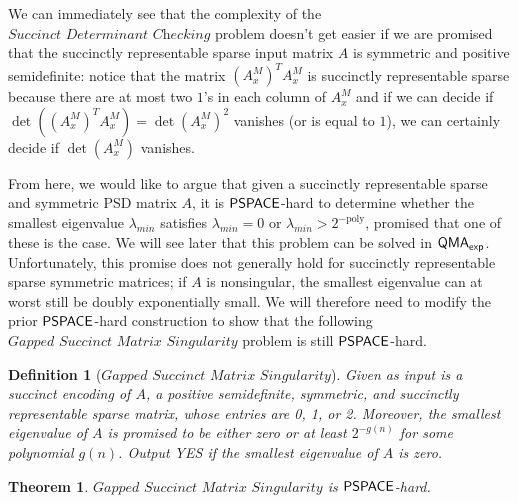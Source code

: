 \documentclass[11pt]{article}
\newtheorem{theorem}{Theorem}
\newtheorem{definition}{Definition}
\theoremstyle{definition}
\theoremstyle{remark}
\newcommand\PSPACE{{\sf{PSPACE}}}
\newcommand\QMAexp{{\sf{QMA}_{exp}}}
\newcommand\succdet{\textit{Succinct Determinant Checking}}
\newcommand\gappedsucc{\textit{Gapped Succinct Matrix Singularity}}
\begin{document}
We can immediately see that the complexity of the $\succdet$ problem doesn't get easier if we are promised that the succinctly representable sparse input matrix $A$ is symmetric and positive semidefinite: notice that the  matrix $(A^M_x)^T A^M_x$ is succinctly representable sparse because there are at most two $1$'s in each column of $A^M_x$ and if we can decide if $\det((A^M_x)^T A^M_x)=\det(A^M_x)^2$ vanishes (or is equal to $1$), we can certainly decide if $\det(A^M_x)$ vanishes. 

From here, we would like to argue that given a succinctly representable sparse and symmetric PSD matrix $A$, it is $\PSPACE$-hard to determine whether the smallest eigenvalue $\lambda_{min}$ satisfies $\lambda_{min} = 0$ or $\lambda_{min} > 2^{-\text{poly}}$, promised that one of these is the case. We will see later that this problem can be solved in $\QMAexp$. Unfortunately, this promise does not generally hold for succinctly representable sparse symmetric matrices; if $A$ is nonsingular, the smallest eigenvalue can at worst still be doubly exponentially small. We will therefore need to modify the prior $\PSPACE$-hard construction to show that the following $\gappedsucc$ problem is still $\PSPACE$-hard.
\begin{definition}[$\gappedsucc$]
Given as input is a succinct encoding of $A$, a positive semidefinite, symmetric, and succinctly representable sparse matrix, whose entries are 0, 1, or 2. Moreover, the smallest eigenvalue of $A$ is promised to be either zero or at least $2^{-g(n)}$ for some polynomial $g(n)$. Output YES if the smallest eigenvalue of $A$ is zero.
\end{definition}
\begin{theorem}\label{thm:gappedsucc}
$\gappedsucc$ is $\PSPACE$-hard.
\end{theorem}
\end{document}

